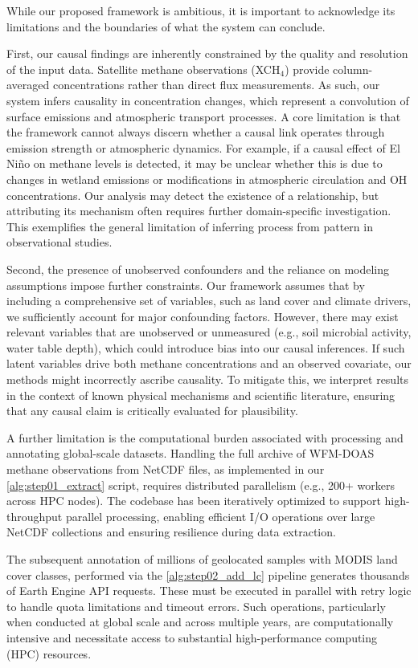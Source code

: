 While our proposed framework is ambitious, it is important to acknowledge its limitations and the boundaries of what the system can conclude.

First, our causal findings are inherently constrained by the quality and resolution of the input data. Satellite methane observations (XCH$_4$) provide column-averaged concentrations rather than direct flux measurements. As such, our system infers causality in concentration changes, which represent a convolution of surface emissions and atmospheric transport processes. A core limitation is that the framework cannot always discern whether a causal link operates through emission strength or atmospheric dynamics. For example, if a causal effect of El Niño on methane levels is detected, it may be unclear whether this is due to changes in wetland emissions or modifications in atmospheric circulation and OH concentrations. Our analysis may detect the existence of a relationship, but attributing its mechanism often requires further domain-specific investigation. This exemplifies the general limitation of inferring process from pattern in observational studies.

Second, the presence of unobserved confounders and the reliance on modeling assumptions impose further constraints. Our framework assumes that by including a comprehensive set of variables, such as land cover and climate drivers, we sufficiently account for major confounding factors. However, there may exist relevant variables that are unobserved or unmeasured (e.g., soil microbial activity, water table depth), which could introduce bias into our causal inferences. If such latent variables drive both methane concentrations and an observed covariate, our methods might incorrectly ascribe causality. To mitigate this, we interpret results in the context of known physical mechanisms and scientific literature, ensuring that any causal claim is critically evaluated for plausibility.

A further limitation is the computational burden associated with processing and annotating global-scale datasets. Handling the full archive of WFM-DOAS methane observations from NetCDF files, as implemented in our \ref{alg:step01_extract} script, requires distributed parallelism (e.g., 200+ workers across HPC nodes). The codebase has been iteratively optimized to support high-throughput parallel processing, enabling efficient I/O operations over large NetCDF collections and ensuring resilience during data extraction.

The subsequent annotation of millions of geolocated samples with MODIS land cover classes, performed via the \ref{alg:step02_add_lc} pipeline generates thousands of Earth Engine API requests. These must be executed in parallel with retry logic to handle quota limitations and timeout errors. Such operations, particularly when conducted at global scale and across multiple years, are computationally intensive and necessitate access to substantial high-performance computing (HPC) resources.

